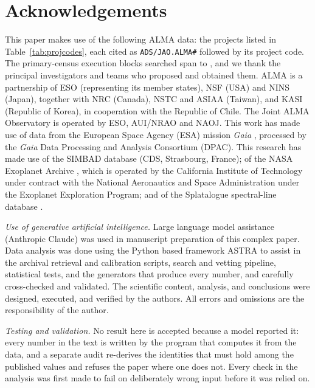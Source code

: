\section*{Acknowledgements}
This paper makes use of the following ALMA data: the \NProjCodes{} projects
listed in Table~\ref{tab:projcodes}, each cited as \texttt{ADS/JAO.ALMA\#}
followed by its project code. The \NEB{} primary-census execution blocks
searched span \PrEbDateFirst{} to \PrEbDateLast{}, and we thank the principal
investigators and teams who proposed and obtained
them.\ProjCodeUnresClause{} ALMA is a partnership of ESO
(representing its member states), NSF (USA) and NINS (Japan), together with NRC
(Canada), NSTC and ASIAA (Taiwan), and KASI (Republic of Korea), in cooperation
with the Republic of Chile. The Joint ALMA Observatory is operated by ESO,
AUI/NRAO and NAOJ. This work has made use of data from the European Space
Agency (ESA) mission {\it Gaia} \citep{GaiaDR3}, processed by the {\it Gaia}
Data Processing and Analysis Consortium (DPAC). This research has made use
of the SIMBAD database \citep{SIMBAD2000} (CDS, Strasbourg, France); of the
NASA Exoplanet Archive \citep{NEA2013}, which is operated by the California
Institute of Technology under contract with the National Aeronautics and
Space Administration under the Exoplanet Exploration Program; and of the
Splatalogue spectral-line database \citep{Splatalogue2007}.

\emph{Use of generative artificial intelligence.} Large language model
assistance (Anthropic Claude) was used in manuscript preparation of this
complex paper. Data analysis was done using the Python based framework ASTRA
\citep[][\href{https://arxiv.org/abs/2610.36144}{https://\allowbreak arxiv.org/\allowbreak abs/}]{White2026ASTRA}
to assist in the archival retrieval and calibration scripts, search and
vetting pipeline, statistical tests, and the generators that produce every
number, and carefully cross-checked and validated. The scientific content,
analysis, and conclusions were designed, executed, and verified by the
authors. All errors and omissions are the responsibility of the author.

\emph{Testing and validation.} No result here is accepted because a model
reported it: every number in the text is written by the program that computes it from the
data, and a separate audit re-derives the identities that must hold among the
published values and refuses the paper where one does not. Every check in the
analysis was first made to fail on deliberately wrong input before it was
relied on.

